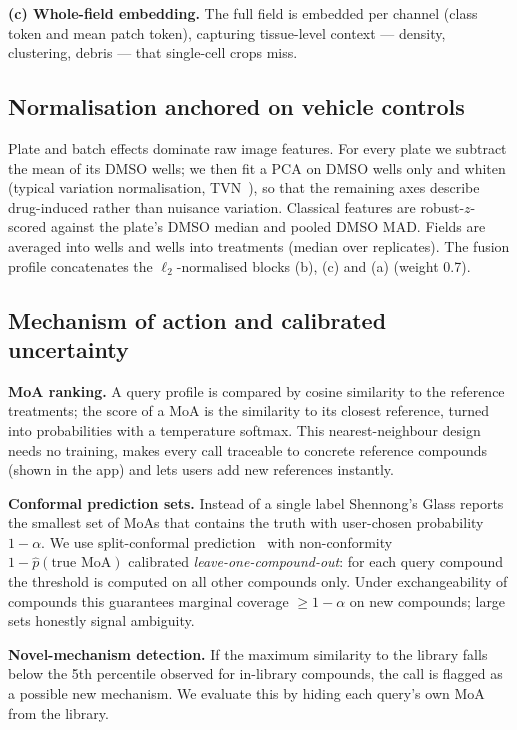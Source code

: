 \documentclass[11pt,a4paper]{article}
\begin{document}
\textbf{(c) Whole-field embedding.} The full field is embedded per channel (class token and mean
patch token), capturing tissue-level context --- density, clustering, debris --- that single-cell
crops miss.

\subsection{Normalisation anchored on vehicle controls}
Plate and batch effects dominate raw image features. For every plate we subtract the mean of its
DMSO wells; we then fit a PCA on DMSO wells only and whiten (typical variation normalisation,
TVN~\cite{ando2017}), so that the remaining axes describe drug-induced rather than nuisance
variation. Classical features are robust-$z$-scored against the plate's DMSO median and pooled
DMSO MAD. Fields are averaged into wells and wells into treatments (median over replicates). The
fusion profile concatenates the $\ell_2$-normalised blocks (b), (c) and (a) (weight 0.7).

\subsection{Mechanism of action and calibrated uncertainty}
\textbf{MoA ranking.} A query profile is compared by cosine similarity to the reference
treatments; the score of a MoA is the similarity to its closest reference, turned into
probabilities with a temperature softmax. This nearest-neighbour design needs no training, makes
every call traceable to concrete reference compounds (shown in the app) and lets users add new
references instantly.

\textbf{Conformal prediction sets.} Instead of a single label Shennong's Glass reports the smallest set
of MoAs that contains the truth with user-chosen probability $1-\alpha$. We use split-conformal
prediction~\cite{vovk2005,angelopoulos2021} with non-conformity $1-\hat p(\text{true MoA})$
calibrated \emph{leave-one-compound-out}: for each query compound the threshold is computed on all
other compounds only. Under exchangeability of compounds this guarantees marginal coverage
$\geq 1-\alpha$ on new compounds; large sets honestly signal ambiguity.

\textbf{Novel-mechanism detection.} If the maximum similarity to the library falls below the 5th
percentile observed for in-library compounds, the call is flagged as a possible new mechanism. We
evaluate this by hiding each query's own MoA from the library.
\end{document}
